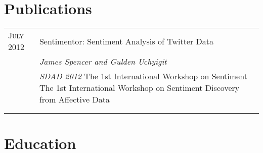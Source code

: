 \documentclass[a4paper,10pt]{article} %
\begin{document}

\section{Publications}

\begin{tabular}{ L{2cm} | L{11cm}}	
\textsc{July} 2012 & Sentimentor: Sentiment Analysis of Twitter Data\\
& \small\emph{James Spencer and Gulden Uchyigit} \\
& \small\emph{SDAD 2012} The 1st International Workshop on Sentiment The 1st International Workshop on Sentiment Discovery from Affective Data\\


&\normalsize \\
&\\
\end{tabular}



\section{Education}
\end{document}
